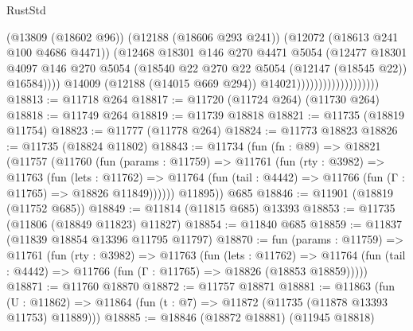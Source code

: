 \begin{lexlean}{RustStd}
\begin{coremodule}
                                            (@13809 (@18602 @96))
                                            (@12188 (@18606 @293 @241))
                                            (@12072 (@18613 @241 @100 @4686 @4471))
                                            (@12468
                                              @18301
                                              @146
                                              @270
                                              @4471
                                              @5054
                                              (@12477
                                                @18301
                                                @4097
                                                @146
                                                @270
                                                @5054
                                                (@18540
                                                  @22
                                                  @270
                                                  @22
                                                  @5054
                                                  (@12147 (@18545 @22))
                                                  @16584))))
                                          @14009
                                          (@12188 (@14015 @669 @294))
                                          @14021)))))))))))))))))))
@18813 := @11718 @264
@18817 := @11720 (@11724 @264) (@11730 @264)
@18818 := @11749 @264
@18819 := @11739 @18818
@18821 := @11735 (@18819 @11754)
@18823 := @11777 (@11778 @264)
@18824 := @11773 @18823
@18826 := @11735 (@18824 @11802)
@18843 := @11734
    (fun (fn : @89) =>
    @18821
      (@11757
        (@11760
          (fun (params : @11759) =>
          @11761
            (fun (rty : @3982) =>
            @11763
              (fun (lets : @11762) =>
              @11764 (fun (tail : @4442) => @11766 (fun (Γ : @11765) => @18826 @11849))))))
        @11895))
    @685
@18846 := @11901 (@18819 (@11752 @685))
@18849 := @11814 (@11815 @685) @13393
@18853 := @11735 (@11806 (@18849 @11823) @11827)
@18854 := @11840 @685
@18859 := @11837 (@11839 @18854 @13396 @11795 @11797)
@18870 := fun (params : @11759) =>
  @11761
    (fun (rty : @3982) =>
    @11763
      (fun (lets : @11762) =>
      @11764 (fun (tail : @4442) => @11766 (fun (Γ : @11765) => @18826 (@18853 @18859)))))
@18871 := @11760 @18870
@18872 := @11757 @18871
@18881 := @11863
    (fun (U : @11862) => @11864 (fun (t : @7) => @11872 (@11735 (@11878 @13393 @11753) @11889)))
@18885 := @18846 (@18872 @18881) (@11945 @18818)

\end{coremodule}
\end{lexlean}
